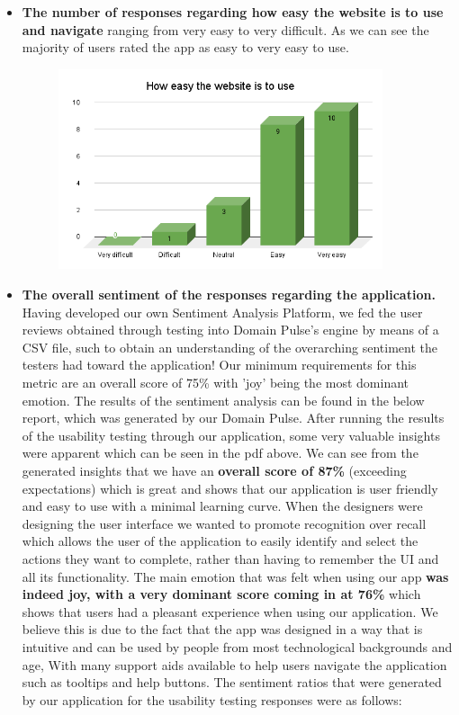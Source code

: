 \documentclass[12pt]{article}
\begin{document}
\begin{itemize}
\begin{figure}[H]
        \end{figure}
    \item \textbf{The number of responses regarding how easy the website is to use and navigate} ranging from very easy to very difficult. As we can see the majority of users rated the app as easy to very easy to use.
        \begin{figure}[H]
            \centering
            \includegraphics[width=0.9\textwidth]{How easy the website is to use.png}
        \end{figure}
    \item \textbf{The overall sentiment of the responses regarding the application.} Having developed our own Sentiment Analysis Platform, we fed the user reviews obtained through testing into Domain Pulse's engine by means of a CSV file, such to obtain an understanding of the overarching sentiment the testers had toward the application! Our minimum requirements for this metric are an overall score of 75\% with 'joy' being the most dominant emotion. The results of the sentiment analysis can be found in the below report, which was generated by our Domain Pulse. After running the results of the usability testing through our application, some very valuable insights were apparent which can be seen in the pdf above. We can see from the generated insights that we have an \textbf{overall score of 87\%} (exceeding expectations) which is great and shows that our application is user friendly and easy to use with a minimal learning curve. When the designers were designing the user interface we wanted to promote recognition over recall which allows the user of the application to easily identify and select the actions they want to complete, rather than having to remember the UI and all its functionality. The main emotion that was felt when using our app \textbf{was indeed joy, with a very dominant score coming in at 76\%} which shows that users had a pleasant experience when using our application. We believe this is due to the fact that the app was designed in a way that is intuitive and can be used by people from most technological backgrounds and age, With many support aids available to help users navigate the application such as tooltips and help buttons. The sentiment ratios that were generated by our application for the usability testing responses were as follows:

\end{itemize}
\end{document}
